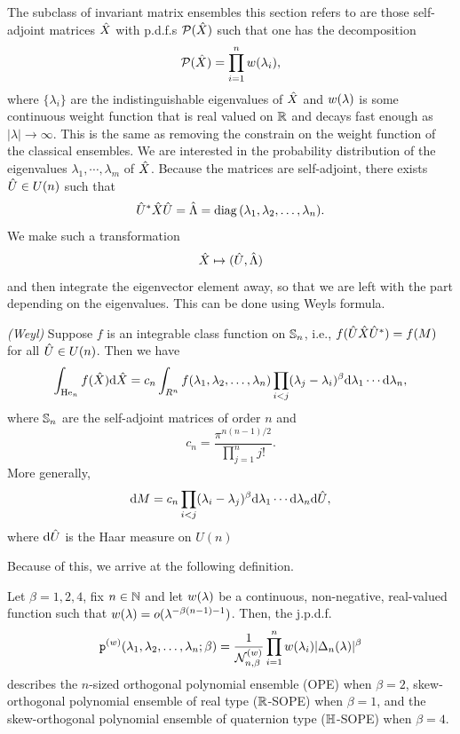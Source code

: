 The subclass of invariant matrix ensembles this section refers to are those self-adjoint matrices $\hat X$ with p.d.f.s $\mathcal{P}(\hat X)$ such that one has the decomposition
\begin{equation}
	\mathcal{P}(\hat X) = \prod_{i=1}^n w(\lambda_i),
\end{equation}
where $\{\lambda_i\}$ are the indistinguishable eigenvalues of $\hat X$ and $w(\lambda)$ is some continuous weight function that is real valued on $\mathbb{R}$ and decays fast enough as $|\lambda| \rightarrow \infty$. This is the same as removing the constrain on the weight function of the classical ensembles. We are interested in the probability distribution of the eigenvalues $\lambda_1, \cdots, \lambda_m$ of $\hat X$. Because the matrices are self-adjoint, there exists $\hat U \in U(n)$ such that
\begin{equation}
	\hat U^* \hat X \hat U = \hat\Lambda = \operatorname{diag}{(\lambda_1, \lambda_2, \dots, \lambda_n)}.
\end{equation} 
We make such a transformation
\begin{equation}
\hat X \mapsto (\hat U, \hat\Lambda)	
\end{equation}
and then integrate the eigenvector element away, so that we are left with the part depending on the eigenvalues. This can be done using Weyls formula.
\begin{teorema}
	\textit{(Weyl)} Suppose $f$ is an integrable class function on $\mathbb{S}_n$, i.e., $f(\hat U \hat X \hat U^*) = f(M)$ for all $\hat U \in U(n)$. Then we have
	\begin{equation}
		\int_{\mathrm{He}_n} f(\hat X) \mathrm{d} \hat X = c_n \int_{R^n} f(\lambda_1, \lambda_2, \dots, \lambda_n) \prod_{i < j} (\lambda_j - \lambda_i)^\beta \mathrm{d} \lambda_1 \cdots \mathrm{d} \lambda_n,
	\end{equation}
	where $\mathbb{S}_n$ are the self-adjoint matrices of order $n$ and
	\begin{equation}
		c_n = \frac{\pi^{n(n-1)/2}}{\prod_{j=1}^{n} j!}.
	\end{equation}
	More generally, 
	\begin{equation}
		\mathrm{d} M = c_n \prod_{i < j} (\lambda_i - \lambda_j)^\beta  \mathrm{d} \lambda_1 \cdots \mathrm{d} \lambda_n \mathrm{d} \hat U,
	\end{equation}
	where $\mathrm{d} \hat U$ is the Haar measure on $U(n)$
\end{teorema}
Because of this, we arrive at the following definition.
\begin{definicao}
	Let $\beta = 1, 2, 4$, fix $n \in \mathbb{N}$ and let $w(\lambda)$ be a continuous, non-negative, real-valued function such that $w(\lambda) = o(\lambda^{-\beta(n-1)-1})$. Then, the j.p.d.f.
	\begin{equation}
		\mathtt{p}^{(w)}(\lambda_1, \lambda_2, \dots, \lambda_n;\beta) = \frac{1}{\mathcal{N}_{n,\beta}^{(w)}} \prod_{i=1}^{n} w(\lambda_i) |\Delta_n(\lambda)|^\beta
	\end{equation}
	describes the $n$-sized orthogonal polynomial ensemble (OPE) when $\beta = 2$, skew-orthogonal polynomial ensemble of real type ($\mathbb{R}$-SOPE) when $\beta=1$, and the skew-orthogonal polynomial ensemble of quaternion type ($\mathbb{H}$-SOPE) when $\beta = 4$.
	\label{Definition: measure-weight}
 \end{definicao}

